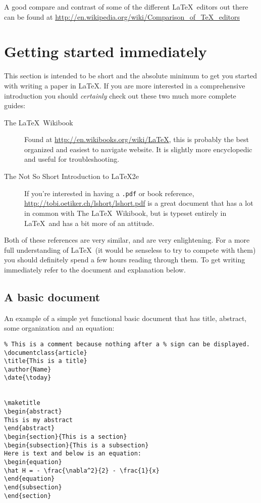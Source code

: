 A good compare and contrast of some of the different \LaTeX\ editors out there can be found at \url{http://en.wikipedia.org/wiki/Comparison_of_TeX_editors}

\section{Getting started immediately }
This section is intended to be short and the absolute minimum to get you started with writing a paper in \LaTeX . If you are more interested in a comprehensive introduction you should \emph{certainly} check out these two much more complete guides:

\begin{description}
\item[The \LaTeX\ Wikibook] Found at \url{http://en.wikibooks.org/wiki/LaTeX}, this is probably the best organized and easiest to navigate website. It is slightly more encyclopedic and useful for troubleshooting.
\item[The Not So Short Introduction to \LaTeX 2e] If you're interested in having a \texttt{.pdf} or book reference, \url{http://tobi.oetiker.ch/lshort/lshort.pdf} is a great document that has a lot in common with The \LaTeX\ Wikibook, but is typeset entirely in \LaTeX\ and has a bit more of an attitude.
\end{description}

Both of these references are very similar, and are very enlightening. For a more full understanding of \LaTeX\ (it would be senseless to try to compete with them) you should definitely spend a few hours reading through them. To get writing immediately refer to the document and explanation below.

\subsection{A basic document}
An example of a simple yet functional basic document that has title, abstract, some organization and an equation:


\begin{framed}
\begin{verbatim}
% This is a comment because nothing after a % sign can be displayed. 
\documentclass{article}
\title{This is a title}
\author{Name}
\date{\today}


\maketitle
\begin{abstract}
This is my abstract
\end{abstract} 
\begin{section}{This is a section}
\begin{subsection}{This is a subsection}
Here is text and below is an equation:
\begin{equation}
\hat H = - \frac{\nabla^2}{2} - \frac{1}{x}
\end{equation}
\end{subsection}
\end{section}

\end{verbatim}
\end{framed}

